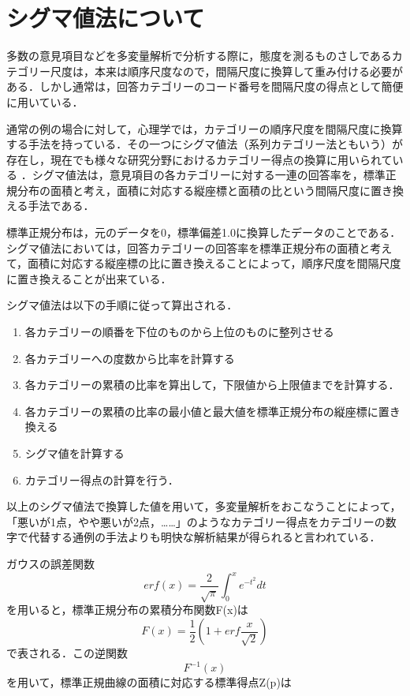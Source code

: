 \documentclass[shuuron]{kuee}
\begin{document}
\appendix
\chapter{シグマ値法について}
多数の意見項目などを多変量解析で分析する際に，態度を測るものさしであるカテゴリー尺度は，本来は順序尺度なので，間隔尺度に換算して重み付ける必要がある．しかし通常は，回答カテゴリーのコード番号を間隔尺度の得点として簡便に用いている．

通常の例の場合に対して，心理学では，カテゴリーの順序尺度を間隔尺度に換算する手法を持っている．その一つにシグマ値法（系列カテゴリー法ともいう）が存在し\cite{likert1932technique}，現在でも様々な研究分野におけるカテゴリー得点の換算に用いられている\cite{シグマ値法使ってる} \cite{岩本隆2016人事}．シグマ値法は，意見項目の各カテゴリーに対する一連の回答率を，標準正規分布の面積と考え，面積に対応する縦座標と面積の比という間隔尺度に置き換える手法である．

標準正規分布は，元のデータを0，標準偏差1.0に換算したデータのことである．シグマ値法においては，回答カテゴリーの回答率を標準正規分布の面積と考えて，面積に対応する縦座標の比に置き換えることによって，順序尺度を間隔尺度に置き換えることが出来ている．

シグマ値法は以下の手順に従って算出される．
\begin{enumerate}
  \item 各カテゴリーの順番を下位のものから上位のものに整列させる
  \item 各カテゴリーへの度数から比率を計算する
  \item 各カテゴリーの累積の比率を算出して，下限値から上限値までを計算する．
  \item 各カテゴリーの累積の比率の最小値と最大値を標準正規分布の縦座標に置き換える
  \item シグマ値を計算する
  \item カテゴリー得点の計算を行う．
\end{enumerate}

以上のシグマ値法で換算した値を用いて，多変量解析をおこなうことによって，「悪いが1点，やや悪いが2点，……」のようなカテゴリー得点をカテゴリーの数字で代替する通例の手法よりも明快な解析結果が得られると言われている．

ガウスの誤差関数
\begin{equation}
  erf(x) = \frac{2}{\sqrt{\pi}}\int_0^x e^{-t^2} dt
\end{equation}
を用いると，標準正規分布の累積分布関数F(x)は
\begin{equation}
  F(x) = \frac{1}{2}(1+erf\frac{x}{\sqrt{2}})
\end{equation}
で表される．この逆関数\begin{equation}F^{-1}(x)\end{equation}を用いて，標準正規曲線の面積に対応する標準得点Z(p)は
\end{document}
